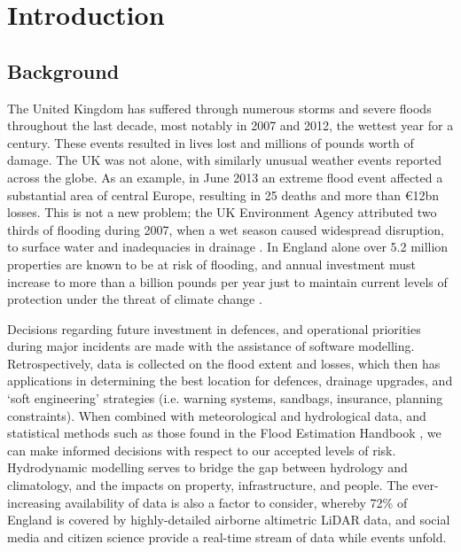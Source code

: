 \chapter{Introduction}
\label{chapter:Introduction}

\section{Background}

The United Kingdom has suffered through numerous storms and severe floods throughout the last decade, most notably in 2007 and 2012, the wettest year for a century. These events resulted in lives lost and millions of pounds worth of damage. The UK was not alone, with similarly unusual weather events reported across the globe. As an example, in June 2013 an extreme flood event affected a substantial area of central Europe, resulting in 25 deaths and more than \euro{12bn} losses. This is not a new problem; the UK Environment Agency attributed two thirds of flooding during 2007, when a wet season caused widespread disruption, to surface water and inadequacies in drainage \citep{Pitt2007}. In England alone over 5.2 million properties are known to be at risk of flooding, and annual investment must increase to more than a billion pounds per year just to maintain current levels of protection under the threat of climate change \citep{EnvironmentAgency2009a}.

Decisions regarding future investment in defences, and operational priorities during major incidents are made with the assistance of software modelling. Retrospectively, data is collected on the flood extent and losses, which then has applications in determining the best location for defences, drainage upgrades, and ‘soft engineering’ strategies (i.e. warning systems, sandbags, insurance, planning constraints). When combined with meteorological and hydrological data, and statistical methods such as those found in the Flood Estimation Handbook \citep{Faulkner1999}, we can make informed decisions with respect to our accepted levels of risk. Hydrodynamic modelling serves to bridge the gap between hydrology and climatology, and the impacts on property, infrastructure, and people. The ever-increasing availability of data is also a factor to consider, whereby 72\% of England is covered by highly-detailed airborne altimetric LiDAR data, and social media and citizen science provide a real-time stream of data while events unfold.

